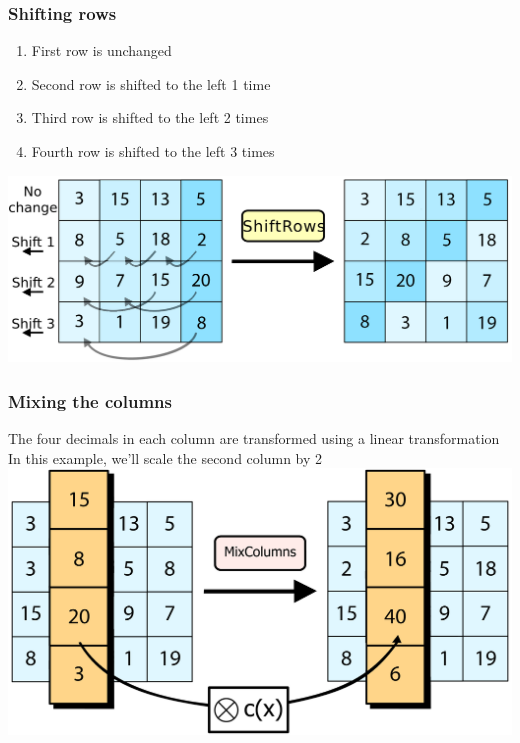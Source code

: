 \documentclass[11pt]{beamer}
\begin{document}
\begin{frame}\frametitle{Shifting rows}
	\begin{enumerate}[1]
		\item First row is unchanged
		\item Second row is shifted to the left 1 time
		\item Third row is shifted to the left 2 times
		\item Fourth row is shifted to the left 3 times
	\end{enumerate}	
	\center \includegraphics[scale=0.15]{shift_rows_1}
\end{frame}

\begin{frame}\frametitle{Mixing the columns}
	The four decimals in each column are transformed using a linear transformation
	\center In this example, we'll scale the second column by 2
	\center \includegraphics[scale=0.05]{mix_column_1}
\end{frame}
\end{document}
